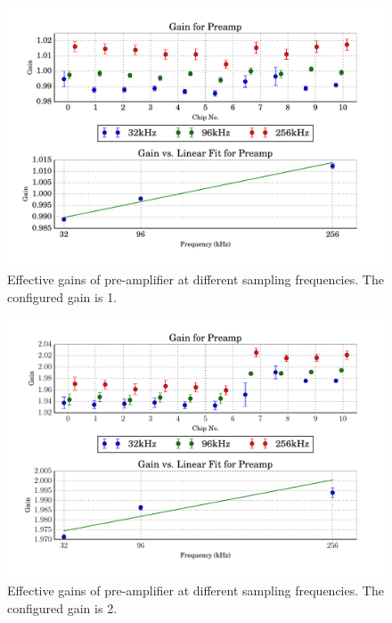 \begin{figure}
    \centering
    \includegraphics[width=0.95\linewidth]{images/plots/dc_slope_preamp_gain+1.pdf}
    \caption{Effective gains of pre-amplifier at different sampling frequencies. The configured gain is 1.}
    \label{fig:preamp_slope+1}
\end{figure}
\begin{figure}
    \centering
    \includegraphics[width=0.95\linewidth]{images/plots/dc_slope_preamp_gain+2.pdf}
    \caption{Effective gains of pre-amplifier at different sampling frequencies. The configured gain is 2.}
    \label{fig:preamp_slope+2}
\end{figure}
